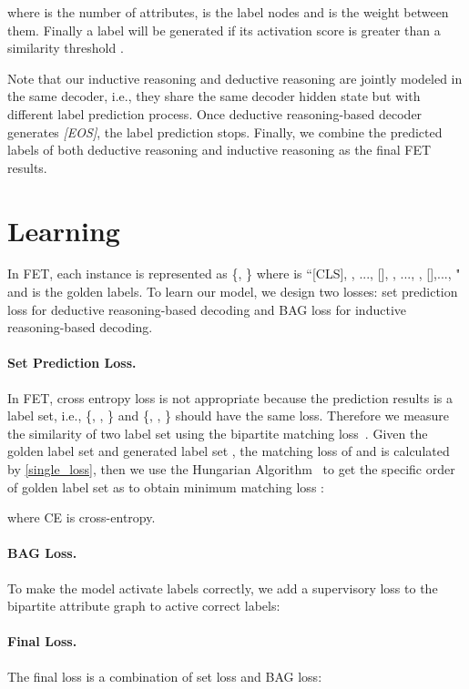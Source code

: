 \documentclass[11pt]{article}
\begin{document}
where  is the number of attributes,  is the  label nodes and  is the weight between them. Finally a label will be generated if its activation score is greater than a similarity threshold .

Note that our inductive reasoning and deductive reasoning are jointly modeled in the same decoder, i.e., they share the same decoder hidden state  but with different label prediction process. Once deductive reasoning-based decoder generates \textit{[EOS]}, the label prediction stops. Finally, we combine the predicted labels of both deductive reasoning and inductive reasoning as the final FET results.

\section{Learning}
In FET, each instance is represented as \{, \} where  is ``[CLS], , ..., [], , ..., , [],..., " and  is the golden labels. To learn our model, we design two losses: set prediction loss for deductive reasoning-based decoding and BAG loss for inductive reasoning-based decoding.

\paragraph{Set Prediction Loss.}
In FET, cross entropy loss is not appropriate because the prediction results is a label set, i.e., \{, , \} and \{, , \} should have the same loss. Therefore we measure the similarity of two label set using the bipartite matching loss~\citep{DBLP:journals/corr/abs-2011-01675_matching_loss}. Given the golden label set  and generated label set , the matching loss  of  and  is calculated by \ref{single_loss}, then we use the Hungarian Algorithm~\citep{kuhn1955hungarian_loss} to get the specific order of golden label set as  to obtain minimum matching loss :

where \textup{CE} is cross-entropy. 

\paragraph{BAG Loss.}
To make the model activate labels correctly, we add a supervisory loss to the bipartite attribute graph to active correct labels:
\normalsize
\paragraph{Final Loss.} The final loss is a combination of set loss and BAG loss:
\end{document}
